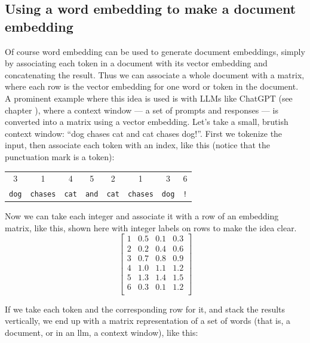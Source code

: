 \subsection{Using a word embedding to make a document embedding}\label{wordEmbeddingMatrix}

Of course word embedding can be used to generate document embeddings, simply by associating each token in a document with its vector embedding and concatenating the result. Thus we can associate a whole document with a matrix, where each row is the vector embedding for one word or token in the document. A prominent example where this idea is used is with LLMs like ChatGPT (see chapter ), where a context window --- a set of prompts and responses --- is converted into a matrix using a vector embedding. Let's take a small, brutish context window:  ``dog chases cat and cat chases dog!''.  First we tokenize the input, then associate each token with an index, like this (notice that the punctuation mark is a token):

\begin{center}
\begin{tabular}{c@{}c@{}c@{}c@{}c@{}c@{}c@{}c}
   3 & 1 & 4 & 5 & 2 & 1 & 3 & \hspace{0.5cm}6 \\
   \texttt{dog} & \texttt{\quad chases} & \texttt{\quad cat} & \texttt{\quad and} & \texttt{\quad cat} & \texttt{\quad chases} & \texttt{\quad dog} & \texttt{\quad !} \\
\end{tabular}
\end{center}

Now we can take each integer and associate it with a row of an embedding matrix, like this, shown here with integer labels on rows to make the idea clear.
\[
\left[\begin{array}{c|ccc}
    1 & 0.5 & 0.1 & 0.3 \\
    2 & 0.2 & 0.4 & 0.6 \\
    3 & 0.7 & 0.8 & 0.9 \\
    4 & 1.0 & 1.1 & 1.2 \\
    5 & 1.3 & 1.4 & 1.5 \\
    6 & 0.3 & 0.1 & 1.2 \\
\end{array}\right]
\]

If we take each token and the corresponding row for it, and stack the results vertically, we end up with a matrix representation of a set of words (that is, a document, or in an llm, a context window), like this: 

